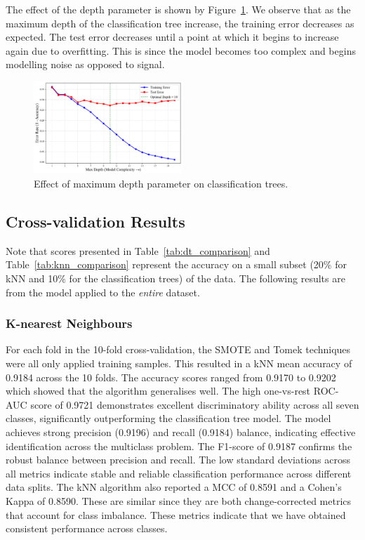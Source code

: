 \documentclass[10pt, conference]{IEEEtran}
\begin{document}
The effect of the depth parameter is shown by Figure~\ref{fig:dt-perf}. We observe that as the maximum depth of the classification tree increase, the training error decreases as expected. The test error decreases until a point at which it begins to increase again due to overfitting. This is since the model becomes too complex and begins modelling noise as opposed to signal.


\begin{figure}[h]
	\centering
	\includegraphics[width=0.5\textwidth]{../plots/dt_training_vs_test_error.pdf}
	\caption{Effect of maximum depth parameter on classification trees.}
	\label{fig:dt-perf}
\end{figure}

\subsection{Cross-validation Results}
Note that scores presented in Table~\ref{tab:dt_comparison} and Table~\ref{tab:knn_comparison} represent the accuracy on a small subset (20\% for kNN and 10\% for the classification trees) of the data. The following results are from the model applied to the \textit{entire} dataset. 

\subsubsection{K-nearest Neighbours}

For each fold in the 10-fold cross-validation, the SMOTE and Tomek techniques were all only applied training samples. This resulted in a kNN mean accuracy of 0.9184 across the 10 folds. The accuracy scores ranged from 0.9170 to 0.9202 which showed that the algorithm generalises well. The high one-vs-rest ROC-AUC score of 0.9721 demonstrates excellent discriminatory ability across all seven classes, significantly outperforming the classification tree model. The model achieves strong precision (0.9196) and recall (0.9184) balance, indicating effective identification across the multiclass problem. The F1-score of 0.9187 confirms the robust balance between precision and recall. The low standard deviations across all metrics indicate stable and reliable classification performance across different data splits. The kNN algorithm also reported a MCC of 0.8591 and a Cohen's  Kappa of 0.8590. These are similar since they are both change-corrected metrics that account for class imbalance. These metrics indicate that we have obtained consistent performance across classes.
\end{document}
